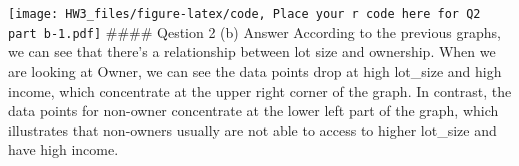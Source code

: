 \documentclass[
]{article}
\begin{document}
\texttt{[image: HW3\_files/figure-latex/code, Place your r code here for Q2 part b-1.pdf]}
\#\#\#\# Qestion 2 (b) Answer According to the previous graphs, we can
see that there's a relationship between lot size and ownership. When we
are looking at Owner, we can see the data points drop at high lot\_size
and high income, which concentrate at the upper right corner of the
graph. In contrast, the data points for non-owner concentrate at the
lower left part of the graph, which illustrates that non-owners usually
are not able to access to higher lot\_size and have high income.
\end{document}

